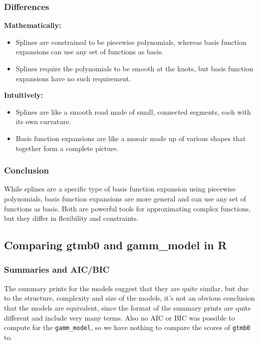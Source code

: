 \subsubsection{Differences}

\textbf{Mathematically:}
\begin{itemize}
    \item Splines are constrained to be piecewise polynomials, whereas basis function expansions can use any set of functions as basis.
    \item Splines require the polynomials to be smooth at the knots, but basis function expansions have no such requirement.
\end{itemize}

\textbf{Intuitively:}
\begin{itemize}
    \item Splines are like a smooth road made of small, connected segments, each with its own curvature.
    \item Basis function expansions are like a mosaic made up of various shapes that together form a complete picture.
\end{itemize}

\subsubsection{Conclusion}

While splines are a specific type of basis function expansion using piecewise polynomials, basis function expansions are more general and can use any set of functions as basis. Both are powerful tools for approximating complex functions, but they differ in flexibility and constraints.
\subsection{Comparing gtmb0 and gamm\_model in R}

\subsubsection{Summaries and AIC/BIC}

The summary prints for the models suggest that they are quite similar, but due to the structure, complexity and size of the models, it's not an obvious conclusion that the models are equivalent, since the format of the summary prints are quite different and include very many terms. 
\newline
Also no AIC or BIC was possible to compute for the \texttt{gamm\_model}, so we have nothing to compare the scores of \texttt{gtmb0} to. 


